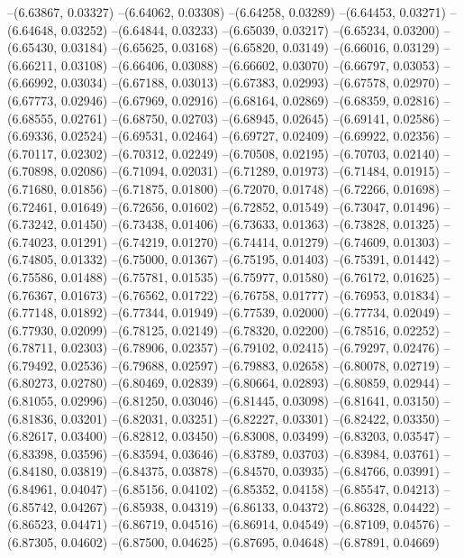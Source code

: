 --(6.63867, 0.03327)
--(6.64062, 0.03308)
--(6.64258, 0.03289)
--(6.64453, 0.03271)
--(6.64648, 0.03252)
--(6.64844, 0.03233)
--(6.65039, 0.03217)
--(6.65234, 0.03200)
--(6.65430, 0.03184)
--(6.65625, 0.03168)
--(6.65820, 0.03149)
--(6.66016, 0.03129)
--(6.66211, 0.03108)
--(6.66406, 0.03088)
--(6.66602, 0.03070)
--(6.66797, 0.03053)
--(6.66992, 0.03034)
--(6.67188, 0.03013)
--(6.67383, 0.02993)
--(6.67578, 0.02970)
--(6.67773, 0.02946)
--(6.67969, 0.02916)
--(6.68164, 0.02869)
--(6.68359, 0.02816)
--(6.68555, 0.02761)
--(6.68750, 0.02703)
--(6.68945, 0.02645)
--(6.69141, 0.02586)
--(6.69336, 0.02524)
--(6.69531, 0.02464)
--(6.69727, 0.02409)
--(6.69922, 0.02356)
--(6.70117, 0.02302)
--(6.70312, 0.02249)
--(6.70508, 0.02195)
--(6.70703, 0.02140)
--(6.70898, 0.02086)
--(6.71094, 0.02031)
--(6.71289, 0.01973)
--(6.71484, 0.01915)
--(6.71680, 0.01856)
--(6.71875, 0.01800)
--(6.72070, 0.01748)
--(6.72266, 0.01698)
--(6.72461, 0.01649)
--(6.72656, 0.01602)
--(6.72852, 0.01549)
--(6.73047, 0.01496)
--(6.73242, 0.01450)
--(6.73438, 0.01406)
--(6.73633, 0.01363)
--(6.73828, 0.01325)
--(6.74023, 0.01291)
--(6.74219, 0.01270)
--(6.74414, 0.01279)
--(6.74609, 0.01303)
--(6.74805, 0.01332)
--(6.75000, 0.01367)
--(6.75195, 0.01403)
--(6.75391, 0.01442)
--(6.75586, 0.01488)
--(6.75781, 0.01535)
--(6.75977, 0.01580)
--(6.76172, 0.01625)
--(6.76367, 0.01673)
--(6.76562, 0.01722)
--(6.76758, 0.01777)
--(6.76953, 0.01834)
--(6.77148, 0.01892)
--(6.77344, 0.01949)
--(6.77539, 0.02000)
--(6.77734, 0.02049)
--(6.77930, 0.02099)
--(6.78125, 0.02149)
--(6.78320, 0.02200)
--(6.78516, 0.02252)
--(6.78711, 0.02303)
--(6.78906, 0.02357)
--(6.79102, 0.02415)
--(6.79297, 0.02476)
--(6.79492, 0.02536)
--(6.79688, 0.02597)
--(6.79883, 0.02658)
--(6.80078, 0.02719)
--(6.80273, 0.02780)
--(6.80469, 0.02839)
--(6.80664, 0.02893)
--(6.80859, 0.02944)
--(6.81055, 0.02996)
--(6.81250, 0.03046)
--(6.81445, 0.03098)
--(6.81641, 0.03150)
--(6.81836, 0.03201)
--(6.82031, 0.03251)
--(6.82227, 0.03301)
--(6.82422, 0.03350)
--(6.82617, 0.03400)
--(6.82812, 0.03450)
--(6.83008, 0.03499)
--(6.83203, 0.03547)
--(6.83398, 0.03596)
--(6.83594, 0.03646)
--(6.83789, 0.03703)
--(6.83984, 0.03761)
--(6.84180, 0.03819)
--(6.84375, 0.03878)
--(6.84570, 0.03935)
--(6.84766, 0.03991)
--(6.84961, 0.04047)
--(6.85156, 0.04102)
--(6.85352, 0.04158)
--(6.85547, 0.04213)
--(6.85742, 0.04267)
--(6.85938, 0.04319)
--(6.86133, 0.04372)
--(6.86328, 0.04422)
--(6.86523, 0.04471)
--(6.86719, 0.04516)
--(6.86914, 0.04549)
--(6.87109, 0.04576)
--(6.87305, 0.04602)
--(6.87500, 0.04625)
--(6.87695, 0.04648)
--(6.87891, 0.04669)
